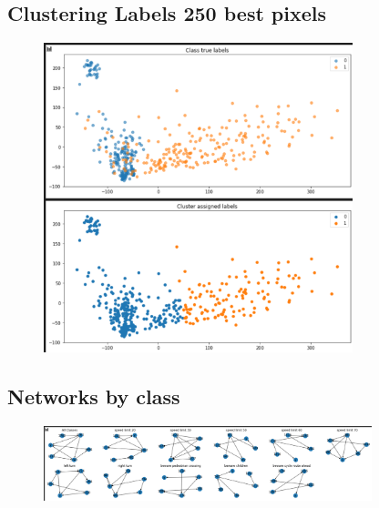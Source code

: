 \documentclass[11pt]{article}
\begin{document}
\begin{appendices}
\newpage
\subsection{Clustering Labels 250 best pixels}\label{LabelClusters2} 
\begin{figure}[h!]
  \includegraphics[width=0.8\textwidth]{Images/LabelClusters2.png}
\end{figure}

\newpage
\subsection{Networks by class}\label{ClassNetworks} 
\begin{figure}[h!]
  \includegraphics[width=0.85\textwidth]{Images/AllClasses.png}
\end{figure}



\end{appendices}
\end{document}
